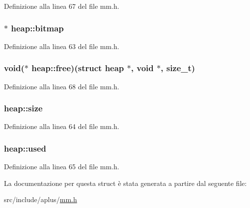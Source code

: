 Definizione alla linea 67 del file mm.\+h.

\hypertarget{structheap_a5243ef46c552fc0968aa2bcdaf6725d1}{
\subsubsection[{bitmap}]{$\ast$ heap\+::bitmap}}\label{structheap_a5243ef46c552fc0968aa2bcdaf6725d1}


Definizione alla linea 63 del file mm.\+h.

\hypertarget{structheap_ae53b14c50bbb9daab4346cd0873bda02}{
\subsubsection[{free}]{\setlength{\rightskip}{0pt plus 5cm}void($\ast$ heap\+::free)(struct {\bf heap} $\ast$, void $\ast$, size\+\_\+t)}}\label{structheap_ae53b14c50bbb9daab4346cd0873bda02}


Definizione alla linea 68 del file mm.\+h.

\hypertarget{structheap_a486fb531d24b9ee5f17b7ffe96689705}{
\subsubsection[{size}]{ heap\+::size}}\label{structheap_a486fb531d24b9ee5f17b7ffe96689705}


Definizione alla linea 64 del file mm.\+h.

\hypertarget{structheap_a37f3f6d6d39562f3cca452eafebcd7ac}{
\subsubsection[{used}]{ heap\+::used}}\label{structheap_a37f3f6d6d39562f3cca452eafebcd7ac}


Definizione alla linea 65 del file mm.\+h.



La documentazione per questa struct è stata generata a partire dal seguente file\+:\begin{DoxyCompactItemize}
\item 
src/include/aplus/\hyperlink{mm_8h}{mm.\+h}\end{DoxyCompactItemize}
